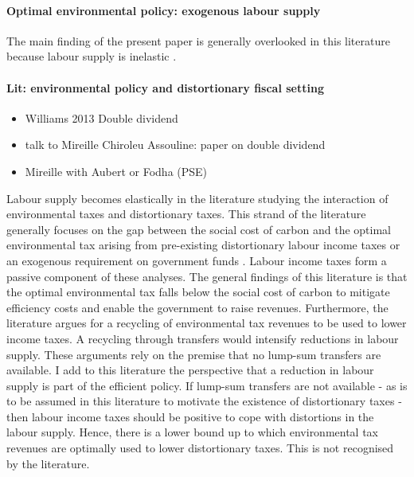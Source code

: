   \paragraph{Optimal environmental policy: exogenous labour supply}
The main finding of the present paper is generally overlooked in this literature because labour supply is inelastic \citep{Golosov2014OptimalEquilibrium, Acemoglu2012TheChang, Fried2018ClimateAnalysis}. 
 
\paragraph{Lit: environmental policy and distortionary fiscal setting}
\begin{itemize}
	\item Williams 2013 Double dividend 
	\item talk to Mireille Chiroleu Assouline: paper on double dividend
	\item Mireille with Aubert or Fodha (PSE)
\end{itemize}
Labour supply becomes elastically in the literature studying the interaction of environmental taxes and distortionary taxes.  This strand of the literature generally focuses on the gap between the social cost of carbon and the optimal environmental tax arising from pre-existing distortionary labour income taxes or an exogenous requirement on government funds \citep{Bovenberg1997EnvironmentalGrowth,  Kaplow2012OPTIMALTAXATION, Jacobs2019RedistributionCurves, Barrage2019OptimalPolicy}. Labour income taxes form a passive component of these analyses. 
The general findings of this literature is that the optimal environmental tax falls below the social cost of carbon to mitigate efficiency costs and enable the government to raise revenues. 
Furthermore, the literature argues for a recycling of environmental tax revenues to be used to lower income taxes. A recycling through transfers would intensify reductions in labour supply. These arguments rely on the premise that no lump-sum transfers are available. I add to this literature the perspective that a reduction in labour supply is part of the efficient policy. If lump-sum transfers are not available - as is to be assumed in this literature to motivate the existence of distortionary taxes - then labour income taxes should be positive to cope with distortions in the labour supply. Hence, there is a lower bound up to which environmental tax revenues are optimally used to lower distortionary taxes. This is not recognised by the literature. 

